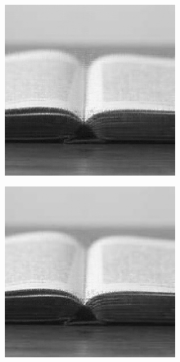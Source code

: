 \begin{figure}
    \begin{subfigure}{0.325\linewidth}
        \includegraphics[width=\linewidth]{Poglavja/Slike/preprosta grayscale 300/rez35TNNM.png}
    \end{subfigure}
    \hfill
    \begin{subfigure}{0.325\linewidth}
        \includegraphics[width=\linewidth]{Poglavja/Slike/preprosta grayscale 300/rez45TNNM.png}

\end{subfigure}
\end{figure}
